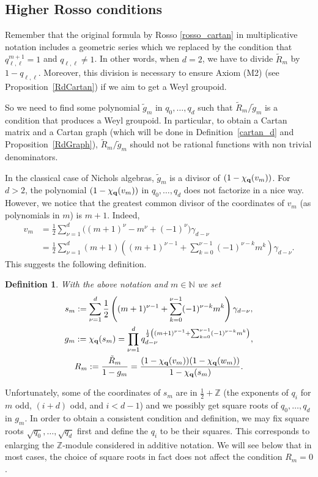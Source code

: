 \documentclass[10pt,a4paper]{amsart}
\numberwithin{equation}{section}
\newtheorem{Definition}[Theorem]{Definition}
\newcommand{\NN }{\mathbb{N}}
\newcommand{\ZZ }{\mathbb{Z}}
\newcommand{\qq }{{\bf q}}
\newcommand{\dn }{d}
\newcommand{\qR }{\tilde R}
\newcommand{\bich }{\chi}
\begin{document}
\subsection{Higher Rosso conditions}
Remember that the original formula by Rosso \eqref{rosso_cartan} in multiplicative notation includes a geometric series which we replaced by the condition that $q_{\ell,\ell}^{m+1}=1$ and $q_{\ell,\ell}\ne 1$. In other words, when $d=2$, we have to divide $\qR_m$ by $1-q_{\ell,\ell}$. Moreover, this division is necessary to ensure Axiom (M2) (see Proposition~\ref{RdCartan}) if we aim to get a Weyl groupoid.

So we need to find some polynomial $\tilde g_m$ in $q_0,\dots,q_d$ such that $\qR_m/\tilde g_m$ is a condition that produces a Weyl groupoid. In particular, to obtain a Cartan matrix and a Cartan graph (which will be done in Definition~\ref{cartan_d} and Proposition~\ref{RdGraph}),
$\qR_m/\tilde g_m$ should not be rational functions with non trivial denominators.

In the classical case of Nichols algebras, $\tilde g_m$ is a divisor of $(1-\chi_\qq(v_m))$. For $d>2$, the polynomial $(1-\chi_\qq(v_m))$ in $q_0,\dots,q_d$ does not factorize in a nice way. However, we notice that the greatest common divisor of the coordinates of $v_m$ (as polynomials in $m$) is $m+1$. Indeed,
\begin{align*}
v_m &= \frac{1}{2}\sum_{\nu=1}^d\big((m+1)^\nu-m^\nu+(-1)^\nu\big)\gamma_{d-\nu} \\
&=\frac{1}{2}\sum_{\nu=1}^d (m+1) \left( (m+1)^{\nu-1}+\sum_{k=0}^{\nu-1} (-1)^{\nu-k} m^k \right)\gamma_{d-\nu}.
\end{align*}
This suggests the following definition.

\begin{Definition}
With the above notation and $m\in\NN$ we set
\begin{gather}
s_m :=  \sum_{\nu=1}^d \frac{1}{2}\left( (m+1)^{\nu-1}+\sum_{k=0}^{\nu-1} (-1)^{\nu-k} m^k \right) \gamma_{\dn-\nu}, \nonumber\\
g_m :=  \chi_\qq(s_m) = \prod_{\nu=1}^d q_{\dn-\nu}^{\frac{1}{2}\left( (m+1)^{\nu-1}+\sum_{k=0}^{\nu-1} (-1)^{\nu-k} m^k \right)}, \nonumber\\
\label{Rossod} R_m :=  \frac{\qR_m}{1-g_m}
= \frac{(1-\bich_\qq(v_m))(1-\bich_\qq(w_m))}{1-\bich_\qq(s_m)}.
\end{gather}
\end{Definition}

Unfortunately, some of the coordinates of $s_m$ are in $\frac{1}{2}+\ZZ$ (the exponents of $q_i$ for $m$ odd, $(i+d)$ odd, and $i<\dn-1$) and we possibly get square roots of $q_0,\dots,q_\dn$ in $g_m$. In order to obtain a consistent condition and definition, we may fix square roots $\sqrt{q_0},\dots,\sqrt{q_\dn}$ first and define the $q_i$ to be their squares. This corresponds to enlarging the $\ZZ$-module considered in additive notation. We will see below that in most cases, the choice of square roots in fact does not affect the condition $R_m=0$.
\end{document}
